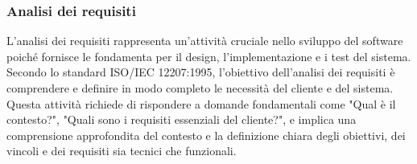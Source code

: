\subsubsection{Analisi dei requisiti}
L'analisi dei requisiti rappresenta un'attività cruciale nello sviluppo del software poiché fornisce le fondamenta per il design, l'implementazione e i test del sistema.
Secondo lo standard ISO/IEC 12207:1995, l'obiettivo dell'analisi dei requisiti è comprendere e definire in modo completo le necessità del cliente e del sistema.
Questa attività richiede di rispondere a domande fondamentali come "Qual è il contesto?", "Quali sono i requisiti essenziali del cliente?", e implica una comprensione approfondita del contesto e la definizione chiara degli obiettivi, dei vincoli e dei requisiti sia tecnici che funzionali.

